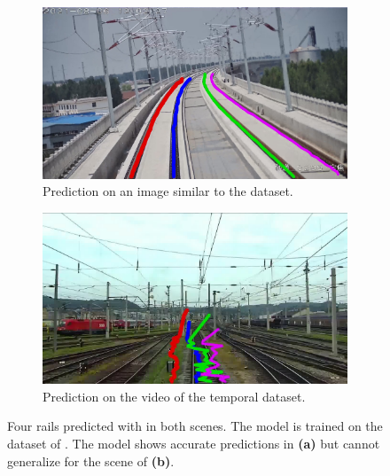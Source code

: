 \begin{figure}[H]
    \centering
    \begin{subfigure}{0.49\textwidth}
        \centering
        \includegraphics[width=\linewidth]{PICs/discussion/multirail_example.jpg}
        \caption{Prediction on an image similar to the dataset.}
        \label{fig:mutlirailTest_a}
    \end{subfigure}
    \hfill
    \begin{subfigure}{0.49\textwidth}
        \centering
        \includegraphics[width=\linewidth]{PICs/discussion/multirail.jpg}
        \caption{Prediction on the video of the temporal dataset.}
        \label{fig:mutlirailTest_b}
    \end{subfigure}
    \caption{Four rails predicted with \cite{li2022rail} in both scenes. The model is trained on the dataset of \cite{li2022rail}. The model shows accurate predictions in \textbf{(a)} but cannot generalize for the scene of \textbf{(b)}.}
    \label{fig:mutlirailTest}
\end{figure}

